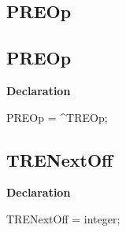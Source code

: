 \documentclass{report}
\newif\ifpdf
\begin{document}
\subsection*{\large{\textbf{PREOp}}\normalsize\hspace{1ex}\hrulefill}
\else
\subsection*{PREOp}
\fi
\label{RegExpr-PREOp}
\begin{list}{}{
\setlength{\itemindent}{0cm}
\setlength{\listparindent}{0cm}
\setlength{\leftmargin}{\evensidemargin}
\addtolength{\leftmargin}{\tmplength}
\settowidth{\labelsep}{X}
\addtolength{\leftmargin}{\labelsep}
\setlength{\labelwidth}{\tmplength}
}
\item[\textbf{Declaration}\hfill]
\ifpdf
\begin{flushleft}
\fi
\begin{ttfamily}
PREOp = {\^{}}TREOp;\end{ttfamily}

\ifpdf
\end{flushleft}
\fi

\end{list}
\ifpdf
\subsection*{\large{\textbf{TRENextOff}}\normalsize\hspace{1ex}\hrulefill}
\else
\subsection*{TRENextOff}
\fi
\label{RegExpr-TRENextOff}
\begin{list}{}{
\setlength{\itemindent}{0cm}
\setlength{\listparindent}{0cm}
\setlength{\leftmargin}{\evensidemargin}
\addtolength{\leftmargin}{\tmplength}
\settowidth{\labelsep}{X}
\addtolength{\leftmargin}{\labelsep}
\setlength{\labelwidth}{\tmplength}
}
\item[\textbf{Declaration}\hfill]
\ifpdf
\begin{flushleft}
\fi
\begin{ttfamily}
TRENextOff = integer;\end{ttfamily}

\ifpdf
\end{flushleft}
\fi

\end{list}
\ifpdf
\end{document}
